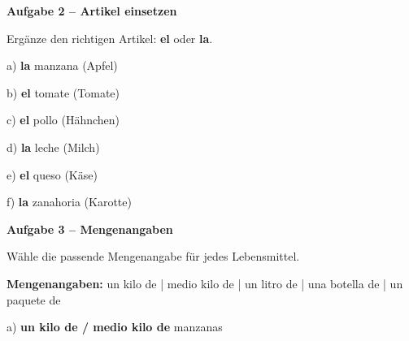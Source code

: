 \documentclass[11pt, a4paper]{article}
\newcommand{\fachfarbe}{spanisch}
\newcommand{\punktebox}[1]{\hfill\fbox{\small \_/#1}}
\newcommand{\lsg}[1]{\textcolor{loesung}{\textbf{#1}}}
\newenvironment{aufgabe}[1]{%
    \needspace{5\baselineskip}%
    \nopagebreak[4]%
    \vspace{10pt}
    \noindent\textbf{\textcolor{\fachfarbe}{Aufgabe #1}}
    \nopagebreak[4]%
    \vspace{5pt}
    \nopagebreak[4]%
    \begin{list}{}{\leftmargin=0pt}
    \item[]
}{%
    \end{list}
}
\newcommand{\es}[1]{\textcolor{\fachfarbe}{\textbf{#1}}}
\begin{document}
\vspace{15pt}


\begin{aufgabe}{2 -- Artikel einsetzen}
Ergänze den richtigen Artikel: \es{el} oder \es{la}. \punktebox{6}
\end{aufgabe}

\noindent
a) \lsg{la} manzana \hfill (Apfel)

\vspace{0.8em}

\noindent
b) \lsg{el} tomate \hfill (Tomate)

\vspace{0.8em}

\noindent
c) \lsg{el} pollo \hfill (Hähnchen)

\vspace{0.8em}

\noindent
d) \lsg{la} leche \hfill (Milch)

\vspace{0.8em}

\noindent
e) \lsg{el} queso \hfill (Käse)

\vspace{0.8em}

\noindent
f) \lsg{la} zanahoria \hfill (Karotte)

\vspace{15pt}


\begin{aufgabe}{3 -- Mengenangaben}
Wähle die passende Mengenangabe für jedes Lebensmittel. \punktebox{5}
\end{aufgabe}

\begin{hinweis}
\textbf{Mengenangaben:} un kilo de | medio kilo de | un litro de | una botella de | un paquete de
\end{hinweis}

\vspace{0.5em}

\noindent
a) \lsg{un kilo de / medio kilo de} manzanas

\vspace{0.8em}
\end{document}
